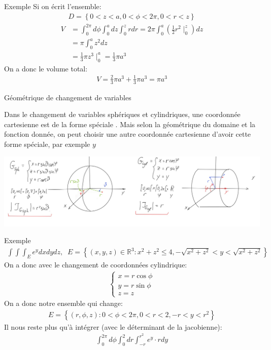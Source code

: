 \begin{parag}{Exemple}
    Si on écrit l'ensemble:
    \begin{align*} 
        D =  \left\{0 < z < a, 0 < \phi < 2\pi, 0 < r < z\right\}
    \end{align*}
    \begin{align*} 
        V &= \int_0^{2\pi}d\phi \int_0^a dz \int_0^z r dr = 2\pi \int_0^a \left(\frac{1}{2}r^2\mid_0^z\right)dz\\
          &= \pi \int_0^a z^2 dz\\
          &= \frac{1}{3}\pi z^3\mid_0^a = \frac{1}{3}\pi a^3
    \end{align*}
    On a donc le volume total:
    \begin{align*} V = \frac{2}{3}\pi a^3 + \frac{1}{3}\pi a^3 =  \pi a^3 \end{align*}
\end{parag}
\begin{parag}{Géométrique de changement de variables}
   \begin{framedremark}
        Dans le changement de variables sphériques et cylindriques, une coordonnée cartesienne est de la forme spéciale . Mais selon la géométrique du domaine et la fonction donnée, on peut choisir une autre coordonnée cartesienne d'avoir cette forme spéciale, par exemple $y$
   \end{framedremark} 
   \begin{center}
       \includegraphics[scale=0.6]{82025-05-26.png}
   \end{center}
\end{parag}


\begin{parag}{Exemple}
    \begin{align*} 
        \int\int\int_E e^y dxdydz, \; \; E = \left\{\left(x, y, z\right) \in \mathbb{R}^{3}: x^2 +z^2 \leq 4, -\sqrt{x^2 + z^2} < y < \sqrt{x^2 + z^2}\right\}
    \end{align*}
   On a donc avec le changement de coordonnées cylindrique:
   \begin{align*} 
   \begin{cases}
       x =  r\cos \phi\\
       y = r\sin \phi\\
       z = z
   \end{cases}
   \end{align*}
   On a donc notre ensemble qui change:
   \begin{align*} 
       E =  \left\{\left(r, \phi, z\right): 0 < \phi < 2\pi, 0 < r < 2, -r < y < r^2\right\}
   \end{align*}
   Il nous reste plus qu'à intégrer (avec le déterminant de la jacobienne):
   \begin{align*} 
       \int_0^{2\pi}d \phi \int_0^2 dr \int_{-r}^{r^2}e^y \cdot  r dy
   \end{align*}
\end{parag}
